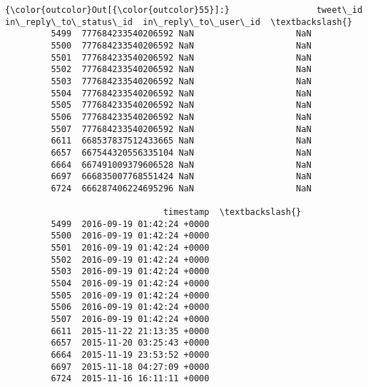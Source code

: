 \documentclass[11pt]{article}
\begin{document}
\begin{Verbatim}[commandchars=\\\{\}]
{\color{outcolor}Out[{\color{outcolor}55}]:}                 tweet\_id  in\_reply\_to\_status\_id  in\_reply\_to\_user\_id  \textbackslash{}
         5499  777684233540206592 NaN                    NaN                    
         5500  777684233540206592 NaN                    NaN                    
         5501  777684233540206592 NaN                    NaN                    
         5502  777684233540206592 NaN                    NaN                    
         5503  777684233540206592 NaN                    NaN                    
         5504  777684233540206592 NaN                    NaN                    
         5505  777684233540206592 NaN                    NaN                    
         5506  777684233540206592 NaN                    NaN                    
         5507  777684233540206592 NaN                    NaN                    
         6611  668537837512433665 NaN                    NaN                    
         6657  667544320556335104 NaN                    NaN                    
         6664  667491009379606528 NaN                    NaN                    
         6697  666835007768551424 NaN                    NaN                    
         6724  666287406224695296 NaN                    NaN                    
         
                               timestamp  \textbackslash{}
         5499  2016-09-19 01:42:24 +0000   
         5500  2016-09-19 01:42:24 +0000   
         5501  2016-09-19 01:42:24 +0000   
         5502  2016-09-19 01:42:24 +0000   
         5503  2016-09-19 01:42:24 +0000   
         5504  2016-09-19 01:42:24 +0000   
         5505  2016-09-19 01:42:24 +0000   
         5506  2016-09-19 01:42:24 +0000   
         5507  2016-09-19 01:42:24 +0000   
         6611  2015-11-22 21:13:35 +0000   
         6657  2015-11-20 03:25:43 +0000   
         6664  2015-11-19 23:53:52 +0000   
         6697  2015-11-18 04:27:09 +0000   
         6724  2015-11-16 16:11:11 +0000   
         

\end{Verbatim}
\end{document}
